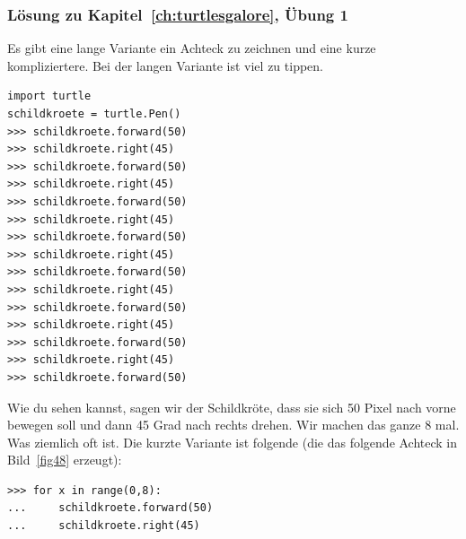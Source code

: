 \noindent
\subsubsection{Lösung zu Kapitel~\ref{ch:turtlesgalore}, Übung 1}
Es gibt eine lange Variante ein Achteck zu zeichnen und eine kurze kompliziertere. Bei der langen Variante ist viel zu tippen. 

\begin{Verbatim}[frame=single]
import turtle
schildkroete = turtle.Pen()
>>> schildkroete.forward(50)
>>> schildkroete.right(45)
>>> schildkroete.forward(50)
>>> schildkroete.right(45)
>>> schildkroete.forward(50)
>>> schildkroete.right(45)
>>> schildkroete.forward(50)
>>> schildkroete.right(45)
>>> schildkroete.forward(50)
>>> schildkroete.right(45)
>>> schildkroete.forward(50)
>>> schildkroete.right(45)
>>> schildkroete.forward(50)
>>> schildkroete.right(45)
>>> schildkroete.forward(50)
\end{Verbatim}

\noindent
Wie du sehen kannst, sagen wir der Schildkröte, dass sie sich 50 Pixel nach vorne bewegen soll und dann 45 Grad nach rechts drehen. Wir machen das ganze 8 mal. Was ziemlich oft ist. Die kurzte Variante ist folgende (die das folgende Achteck in Bild~\ref{fig48} erzeugt):

\begin{Verbatim}[frame=single]
>>> for x in range(0,8):
...     schildkroete.forward(50)
...     schildkroete.right(45)
\end{Verbatim}

